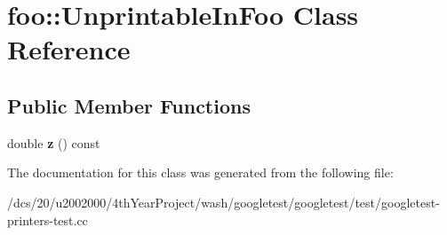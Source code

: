 \hypertarget{classfoo_1_1UnprintableInFoo}{}\section{foo\+:\+:Unprintable\+In\+Foo Class Reference}
\label{classfoo_1_1UnprintableInFoo}
\subsection*{Public Member Functions}
\begin{DoxyCompactItemize}
\item 
\mbox{\label{classfoo_1_1UnprintableInFoo_a3dc8c8e90906bb6f3376474d545e488c}} 
double {\bfseries z} () const
\end{DoxyCompactItemize}


The documentation for this class was generated from the following file\+:\begin{DoxyCompactItemize}
\item 
/dcs/20/u2002000/4th\+Year\+Project/wash/googletest/googletest/test/googletest-\/printers-\/test.\+cc\end{DoxyCompactItemize}
